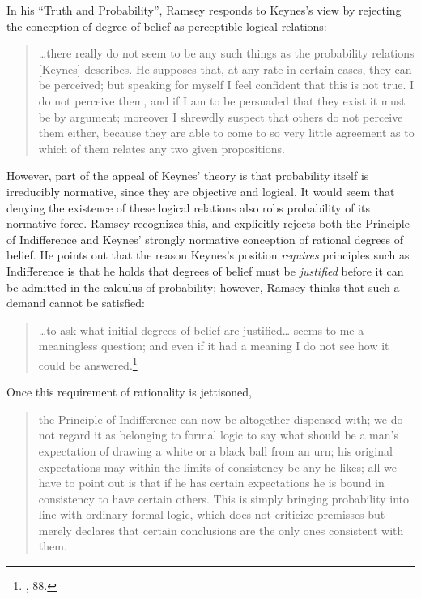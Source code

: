 In his ``Truth and Probability'', Ramsey responds to Keynes's view by
rejecting the conception of degree of belief as perceptible logical
relations:

\begin{quote}
\ldots{}there really do not seem to be any such things as the
probability relations {[}Keynes{]} describes. He supposes that, at any
rate in certain cases, they can be perceived; but speaking for myself I
feel confident that this is not true. I do not perceive them, and if I
am to be persuaded that they exist it must be by argument; moreover I
shrewdly suspect that others do not perceive them either, because they
are able to come to so very little agreement as to which of them relates
any two given propositions.
\end{quote}

However, part of the appeal of Keynes' theory is that probability itself
is irreducibly normative, since they are objective and logical. It would seem that denying the existence of these logical relations also robs probability of its normative force. Ramsey recognizes this, and explicitly rejects both the Principle of Indifference and Keynes' strongly normative conception of rational degrees of belief. He points out that the reason Keynes's position
\emph{requires} principles such as Indifference is that he holds that
degrees of belief must be \emph{justified} before it can be admitted in
the calculus of probability; however, Ramsey thinks that such a demand
cannot be satisfied:

\begin{quote}
\ldots{}to ask what initial degrees of belief are justified\ldots{}
seems to me a meaningless question; and even if it had a meaning I do
not see how it could be answered.\footnote{\cite{ramsey}, 88.}
\end{quote}

Once this requirement of rationality is jettisoned,

\begin{quote}
the Principle of Indifference can now be altogether dispensed with; we
do not regard it as belonging to formal logic to say what should be a
man's expectation of drawing a white or a black ball from an urn; his
original expectations may within the limits of consistency be any he
likes; all we have to point out is that if he has certain expectations
he is bound in consistency to have certain others. This is simply
bringing probability into line with ordinary formal logic, which does
not criticize premisses but merely declares that certain conclusions are
the only ones consistent with them.
\end{quote}

